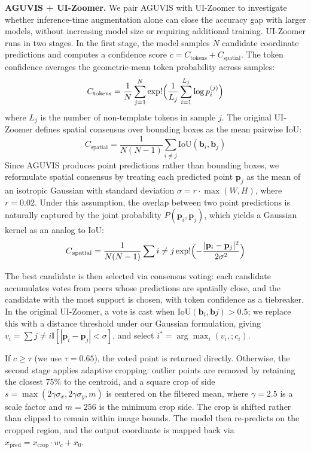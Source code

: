 \documentclass{article}
\theoremstyle{plain}
\theoremstyle{definition}
\theoremstyle{remark}
\begin{document}
\textbf{AGUVIS + UI-Zoomer.} We pair AGUVIS with UI-Zoomer\cite{uizoomer} to investigate whether inference-time augmentation alone can close the accuracy gap with larger models, without increasing model size or requiring additional training. UI-Zoomer runs in two stages. In the first stage, the model samples $N$ candidate coordinate predictions and computes a confidence score $c = C_{\text{tokens}} + C_{\text{spatial}}$. The token confidence averages the geometric-mean token probability across samples: $$ C_{\text{tokens}} = \frac{1}{N}\sum_{j=1}^{N} \exp!\Bigl(\frac{1}{L_j}\sum_{i=1}^{L_j} \log p_i^{(j)}\Bigr) $$ where $L_j$ is the number of non-template tokens in sample $j$. The original UI-Zoomer defines spatial consensus over bounding boxes as the mean pairwise IoU: $$ C_{\text{spatial}} = \frac{1}{N(N-1)}\sum_{i \neq j} \text{IoU}(\mathbf{b}_i, \mathbf{b}_j) $$ Since AGUVIS produces point predictions rather than bounding boxes, we reformulate spatial consensus by treating each predicted point $\mathbf{p}_j$ as the mean of an isotropic Gaussian with standard deviation $\sigma = r \cdot \max(W, H)$, where $r = 0.02$. Under this assumption, the overlap between two point predictions is naturally captured by the joint probability $P(\mathbf{p}_i, \mathbf{p}_j)$, which yields a Gaussian kernel as an analog to IoU: $$ C{_\text{spatial}} = \frac{1}{N(N-1)}\sum{i \neq j} \exp!\Bigl(-\frac{|\mathbf{p}_i - \mathbf{p}_j|^2}{2\sigma^2}\Bigr) $$ 

The best candidate is then selected via consensus voting: each candidate accumulates votes from peers whose predictions are spatially close, and the candidate with the most support is chosen, with token confidence as a tiebreaker. In the original UI-Zoomer, a vote is cast when $\text{IoU}(\mathbf{b}_i, \mathbf{b}j) > 0.5$; we replace this with a distance threshold under our Gaussian formulation, giving $v_i = \sum{j \neq i} \mathbb{I}[|\mathbf{p}_i - \mathbf{p}_j| < \sigma]$, and select $i^* = \arg\max_i (v_i,; c_i)$.

If $c \geq \tau$ (we use $\tau = 0.65$), the voted point is returned directly. Otherwise, the second stage applies adaptive cropping: outlier points are removed by retaining the closest 75\% to the centroid, and a square crop of side $s = \max(2\gamma\sigma_x, 2\gamma\sigma_y, m)$ is centered on the filtered mean, where $\gamma = 2.5$ is a scale factor and $m = 256$ is the minimum crop side. The crop is shifted rather than clipped to remain within image bounds. The model then re-predicts on the cropped region, and the output coordinate is mapped back via $x_{\text{pred}} = x_{\text{crop}} \cdot w_c + x_0$.
\end{document}
